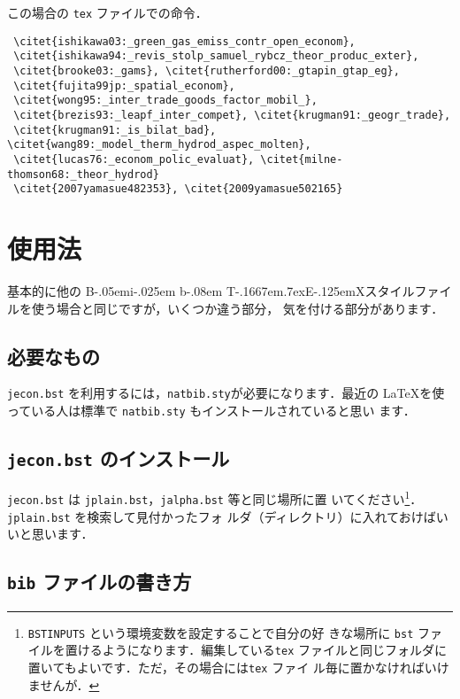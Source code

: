 \documentclass[a4j,10pt]{jarticle}
\def\BibTeX{{\rm B\kern-.05em{\sc i\kern-.025em b}\kern-.08em
    T\kern-.1667em\lower.7ex\hbox{E}\kern-.125emX}}
\begin{document}
この場合の \texttt{tex} ファイルでの命令．

\begin{screen}
\begin{verbatim}
 \citet{ishikawa03:_green_gas_emiss_contr_open_econom},
 \citet{ishikawa94:_revis_stolp_samuel_rybcz_theor_produc_exter},
 \citet{brooke03:_gams}, \citet{rutherford00:_gtapin_gtap_eg},
 \citet{fujita99jp:_spatial_econom},
 \citet{wong95:_inter_trade_goods_factor_mobil_},
 \citet{brezis93:_leapf_inter_compet}, \citet{krugman91:_geogr_trade},
 \citet{krugman91:_is_bilat_bad}, \citet{wang89:_model_therm_hydrod_aspec_molten},
 \citet{lucas76:_econom_polic_evaluat}, \citet{milne-thomson68:_theor_hydrod}
 \citet{2007yamasue482353}, \citet{2009yamasue502165} 
\end{verbatim}
\end{screen}


\section{使用法}

基本的に他の \BibTeX スタイルファイルを使う場合と同じですが，いくつか違う部分，
気を付ける部分があります．

\subsection{必要なもの}

\texttt{jecon.bst} を利用するには，\texttt{natbib.sty}が必要になります．最近の
\LaTeX を使っている人は標準で \texttt{natbib.sty} もインストールされていると思い
ます．


\subsection{\texttt{jecon.bst} のインストール}

\texttt{jecon.bst} は \texttt{jplain.bst}，\texttt{jalpha.bst} 等と同じ場所に置
いてください\footnote{\texttt{BSTINPUTS} という環境変数を設定することで自分の好
きな場所に \texttt{bst} ファイルを置けるようになります．編集している\texttt{tex}
ファイルと同じフォルダに置いてもよいです．ただ，その場合には\texttt{tex} ファイ
ル毎に置かなければいけませんが．}．\texttt{jplain.bst} を検索して見付かったフォ
ルダ（ディレクトリ）に入れておけばいいと思います．

\subsection{\texttt{bib} ファイルの書き方}
\end{document}
